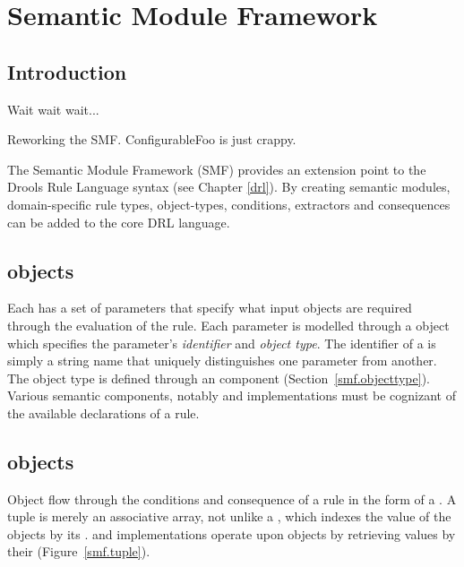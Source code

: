 \chapter{Semantic Module Framework}
\label{smf}

\section{Introduction}

\begin{implnote}
Wait wait wait...

Reworking the SMF.  ConfigurableFoo is just crappy.
\end{implnote}

The Semantic Module Framework (SMF)
provides an extension point to the Drools Rule Language syntax
(see Chapter \vref{drl}).  By creating semantic modules,
domain-specific rule types, object-types, conditions, extractors and consequences
can be added to the core DRL language.

\section{ objects}
\label{smf.declaration}

Each  has a set of parameters that specify what input objects
are required through the evaluation of the rule.  Each parameter is
modelled through a  object which specifies the
parameter's \emph{identifier} and \emph{object type}.  The
identifier of a  is simply a string name that
uniquely distinguishes one parameter from another.  The object type
is defined through an  component
(Section~\vref{smf.objecttype}).  Various semantic components, notably
 and  implementations
must be cognizant of the available declarations of a rule.

\section{ objects}

Object flow through the conditions and consequence of a rule in the
form of a .  A tuple is merely an associative
array, not unlike a , which indexes the value of
the objects by its .   and
 implementations operate upon  objects
by retrieving values by their 
(Figure~\vref{smf.tuple}).

